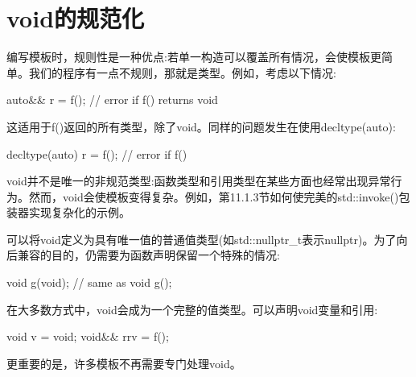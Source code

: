 \section{void的规范化}
编写模板时，规则性是一种优点:若单一构造可以覆盖所有情况，会使模板更简单。我们的程序有一点不规则，那就是类型。例如，考虑以下情况:

\begin{cpp}
auto&& r = f(); // error if f() returns void
\end{cpp}

这适用于f()返回的所有类型，除了void。同样的问题发生在使用decltype(auto):

\begin{cpp}
decltype(auto) r = f(); // error if f()
\end{cpp}

void并不是唯一的非规范类型:函数类型和引用类型在某些方面也经常出现异常行为。然而，void会使模板变得复杂。例如，第11.1.3节如何使完美的std::invoke()包装器实现复杂化的示例。

可以将void定义为具有唯一值的普通值类型(如std::nullptr\_t表示nullptr)。为了向后兼容的目的，仍需要为函数声明保留一个特殊的情况:

\begin{cpp}
void g(void); // same as void g();
\end{cpp}

在大多数方式中，void会成为一个完整的值类型。可以声明void变量和引用:

\begin{cpp}
void v = void{};
void&& rrv = f();
\end{cpp}

更重要的是，许多模板不再需要专门处理void。













































